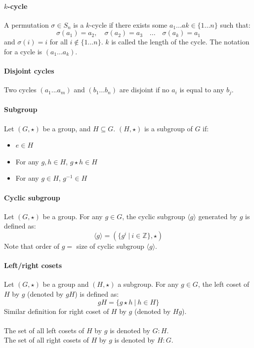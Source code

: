 \documentclass{article}
\newcommand{\Z}{\mathbb{Z}}
\begin{document}
\paragraph{$ k $-cycle}
A permutation $ \sigma \in S_{n} $ is a $ k $-cycle if there exists some $ a_{1}...a{k}  \in \{1...n\} $ such that:
\begin{equation}
\sigma(a_{1}) = a_{2}, \quad \sigma(a_{2}) = a_{3} \quad ... \quad \sigma(a_{k}) = a_{1}
\end{equation}
and $ \sigma(i) = i $ for all $ i \notin \{1...n\} $. $ k $ is called the length of the cycle. The notation for a cycle is $ (a_{1}...a_{k}) $.
\paragraph{Disjoint cycles}
Two cycles $ (a_{1}...a_{m}) $ and $ (b_{1}...b_{n}) $ are disjoint if no $ a_{i} $ is equal to any $ b_{j} $.
\paragraph{Subgroup}
Let $ (G, \star) $ be a group, and $ H \subseteq G $. $ (H, \star) $ is a subgroup of $ G $ if:
\begin{itemize}
\item $ e \in H $
\item For any $ g, h \in H $,  $ g \star h \in H $
\item For any $ g \in H $, $ g^{-1} \in H $
\end{itemize}
\paragraph{Cyclic subgroup}
Let $ (G, \star) $ be a group. For any $ g \in G $, the cyclic subgroup $ \langle g \rangle $ generated by $ g $ is defined as:
\begin{equation}
\langle g \rangle = (\{g^{i} \ | \ i \in \Z \}, \star)
\end{equation}
Note that order of $ g  = $  size of cyclic subgroup $ \langle g \rangle $.
\paragraph{Left/right cosets}
Let $ (G, \star) $ be a group and $ (H, \star) $ a subgroup. For any $ g \in G $, the left coset of $ H $ by $ g $ (denoted by $ gH $) is defined as:
\begin{equation}
gH = \{g \star h \ | \ h \in H \}
\end{equation}
Similar definition for right coset of $ H $ by $ g $ (denoted by $ Hg $).
\\\\
The set of all left cosets of $ H $ by $ g $ is denoted by $ G : H $.
\\
The set of all right cosets of $ H $ by $ g $ is denoted by $ H : G $.
\end{document}
